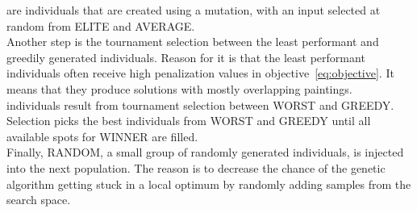  are individuals that are created using a mutation,
with an input selected at random from ELITE and AVERAGE.\\

Another step is the tournament selection between the least performant and greedily generated individuals.
Reason for it is that the least performant individuals often receive high penalization
values in objective~\ref{eq:objective}.
It means that they produce solutions with mostly overlapping paintings.
\\

 individuals result from tournament selection between WORST and GREEDY.
Selection picks the best individuals from WORST and GREEDY until all available spots for WINNER are filled. \\

Finally, RANDOM, a small group of randomly generated individuals, is injected into the next population.
The reason is to decrease the chance of the genetic algorithm getting stuck in a local optimum
by randomly adding samples from the search space.
